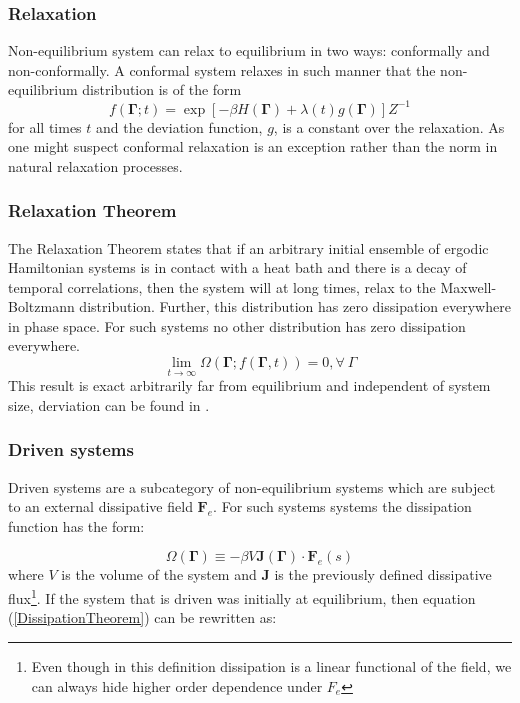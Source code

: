 \documentclass[a4paper,12pt]{article}
\begin{document}
\subsubsection{Relaxation}

Non-equilibrium system can relax to equilibrium in two ways: conformally and non-conformally.
A conformal system relaxes in such manner that the non-equilibrium distribution is of the form
\begin{equation}
  f(\bm{\Gamma};t)=\exp[-\beta H(\bm{\Gamma})+\lambda(t) g(\bm{\Gamma})] Z^{-1}
\end{equation}
for all times $t$ and the deviation function, $g$, is a constant over the relaxation.
As one might suspect conformal relaxation is an exception rather than the norm in natural relaxation processes.

\subsubsection{Relaxation Theorem}
The Relaxation Theorem states that if an arbitrary initial ensemble of ergodic Hamiltonian systems is in contact with a heat bath and there is a decay of temporal correlations, then the system will at long times, relax to the Maxwell-Boltzmann distribution. Further, this distribution has zero dissipation everywhere in phase space. For such systems no other distribution has zero dissipation everywhere.
\begin{displaymath}
  \lim_{t\to \infty } \Omega (\bm{\Gamma} ;f(\bm{\Gamma} ,t))=0, \forall\ \Gamma
\end{displaymath}
This result is exact arbitrarily far from equilibrium and independent of system size, derviation can be found in \cite{Evans:2241458}.
\subsubsection{Driven systems}

Driven systems are a subcategory of non-equilibrium systems which are subject to an external dissipative field $\bm{F}_e$.
For such systems systems the dissipation function has the form:

\begin{equation}
\label{primaryDissipationFunction}
  \Omega(\bm{\Gamma})\equiv - \beta V \bm{J}(\bm{\Gamma})\cdot \bm{F}_e(s)
\end{equation}
where $V$ is the volume of the system and $\bm{J}$ is the previously defined dissipative flux\footnote{Even though in this definition dissipation is a linear functional of the field, we can always hide higher order dependence under $F_e$}.
If the system that is driven was initially at equilibrium, then equation (\ref{DissipationTheorem}) can be rewritten as:
\end{document}
